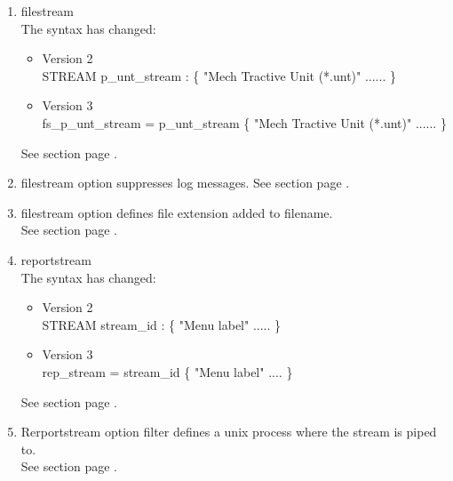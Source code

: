 \begin{enumerate}
\item filestream \\
The syntax has changed:
\begin{itemize}
\item Version 2 \\
STREAM p\_unt\_stream : \FILESTREAM \{ "Mech Tractive Unit (*.unt)" ...... \} \\
\item Version 3 \\
\FILESTREAM{} fs\_p\_unt\_stream = p\_unt\_stream \{ "Mech Tractive Unit (*.unt)" ...... \} \\
\end{itemize}
See section  page \pageref{sec:opfilestreams}. \\
\item filestream option \NOLOG{} suppresses log messages.
See section  page \pageref{sec:opfilestreams}. \\
\item filestream option \EXTENSION{} defines file extension added to filename.\\
See section  page \pageref{sec:opfilestreams}. \\
\item reportstream \\
The syntax has changed:
\begin{itemize}
\item Version 2 \\
STREAM stream\_id : \REPORTSTREAM \{ "Menu label" ..... \} \\
\item Version 3 \\
\REPORTSTREAM{} rep\_stream = stream\_id \{ "Menu label" .... \} \\
\end{itemize}
See section  page \pageref{sec:opreportstreams}. \\
\item Rerportstream option filter defines a unix process 
where the stream is piped to. \\
See section  page \pageref{sec:opreportstreams}. \\
\end{enumerate}
